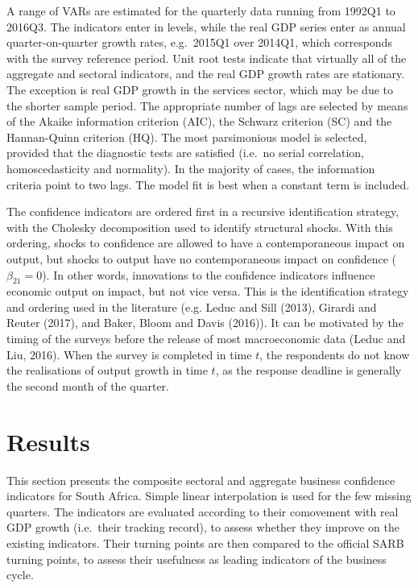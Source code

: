\documentclass[11pt,]{article}
\begin{document}
A range of VARs are estimated for the quarterly data running from 1992Q1
to 2016Q3. The indicators enter in levels, while the real GDP series
enter as annual quarter-on-quarter growth rates, e.g.~2015Q1 over
2014Q1, which corresponds with the survey reference period. Unit root
tests indicate that virtually all of the aggregate and sectoral
indicators, and the real GDP growth rates are stationary. The exception
is real GDP growth in the services sector, which may be due to the
shorter sample period. The appropriate number of lags are selected by
means of the Akaike information criterion (AIC), the Schwarz criterion
(SC) and the Hannan-Quinn criterion (HQ). The most parsimonious model is
selected, provided that the diagnostic tests are satisfied (i.e.~no
serial correlation, homoscedasticity and normality). In the majority of
cases, the information criteria point to two lags. The model fit is best
when a constant term is included.

The confidence indicators are ordered first in a recursive
identification strategy, with the Cholesky decomposition used to
identify structural shocks. With this ordering, shocks to confidence are
allowed to have a contemporaneous impact on output, but shocks to output
have no contemporaneous impact on confidence (\(\beta_{21} = 0\)). In
other words, innovations to the confidence indicators influence economic
output on impact, but not vice versa. This is the identification
strategy and ordering used in the literature (e.g. Leduc and Sill
(2013), Girardi and Reuter (2017), and Baker, Bloom and Davis (2016)).
It can be motivated by the timing of the surveys before the release of
most macroeconomic data (Leduc and Liu, 2016). When the survey is
completed in time \(t\), the respondents do not know the realisations of
output growth in time \(t\), as the response deadline is generally the
second month of the quarter.

\section{Results}\label{results}

This section presents the composite sectoral and aggregate business
confidence indicators for South Africa. Simple linear interpolation is
used for the few missing quarters. The indicators are evaluated
according to their comovement with real GDP growth (i.e.~their tracking
record), to assess whether they improve on the existing indicators.
Their turning points are then compared to the official SARB turning
points, to assess their usefulness as leading indicators of the business
cycle.
\end{document}

